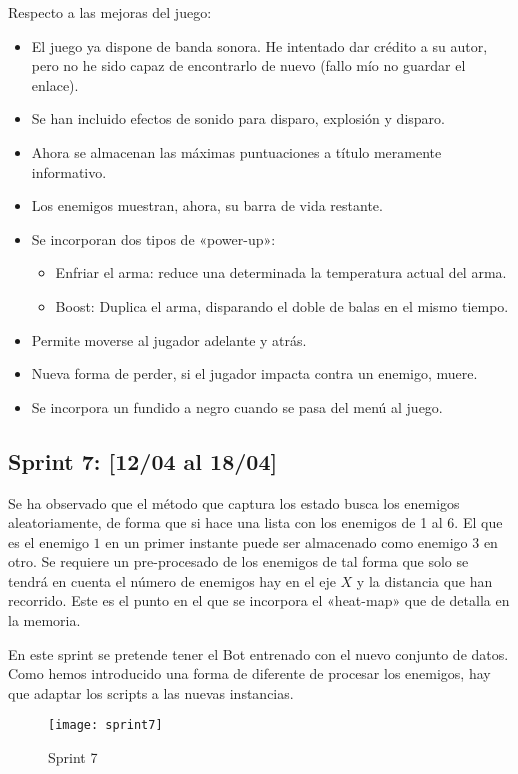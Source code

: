 Respecto a las mejoras del juego:
\begin{itemize}
    \item El juego ya dispone de banda sonora. He intentado dar crédito a su autor, pero no he sido capaz de encontrarlo de nuevo (fallo mío no guardar el enlace).
    \item Se han incluido efectos de sonido para disparo, explosión y disparo.
    \item Ahora se almacenan las máximas puntuaciones a título meramente informativo.
    \item Los enemigos muestran, ahora, su barra de vida restante.
    \item Se incorporan dos tipos de «power-up»:
    \begin{itemize}
        \item Enfriar el arma: reduce una determinada la temperatura actual del arma.
        \item Boost: Duplica el arma, disparando el doble de balas en el mismo tiempo.
    \end{itemize}
    \item Permite moverse al jugador adelante y atrás.
    \item Nueva forma de perder, si el jugador impacta contra un enemigo, muere.
    \item Se incorpora un fundido a negro cuando se pasa del menú al juego.
\end{itemize}



\subsection{Sprint 7:  [12/04 al 18/04]}

Se ha observado que el método que captura los estado busca los enemigos aleatoriamente, de forma que si hace una lista con los enemigos de 1 al 6. El que es el enemigo $1$ en un primer instante puede ser almacenado como enemigo $3$ en otro. Se requiere un pre-procesado de los enemigos de tal forma que solo se tendrá en cuenta el número de enemigos hay en el eje $X$ y la distancia que han recorrido. Este es el punto en el que se incorpora el «heat-map» que de detalla en la memoria.

En este sprint se pretende tener el Bot entrenado con el nuevo conjunto de datos. Como hemos introducido una forma de diferente de procesar los enemigos, hay que adaptar los scripts a las nuevas instancias.

\begin{figure}[h!]
    \centering
    \texttt{[image: sprint7]}
    \caption{Sprint 7}
    \label{fig:s7}
\end{figure}



